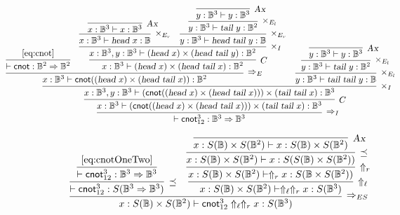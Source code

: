 \documentclass[preprint]{elsarticle}
\newcommand\B{\ensuremath{\mathbb B}}
\newcommand\s[1]{\ensuremath{\mathsf{#1}}}
\newcommand\head{\text{\sl head}}
\newcommand\tail{\text{\sl tail}}
\newcommand\tax{\textsl{Ax}}
\begin{document}
\begin{equation}
  \label{eq:cnotOneTwo}
  {
    \hspace{-1.5cm}
    \infer[\Rightarrow_I]
    {\vdash \s{cnot}_{12}^3:\B^3\Rightarrow\B^3}
    {
      \infer[C]
      {x:\B^3\vdash (\s{cnot}((\head\ x)\times(\head\ \tail\ x)))\times(\tail\ \tail\ x):\B^3}
      {
        \infer[\times_I]
        {x:\B^3,y:\B^3\vdash (\s{cnot}((\head\ x)\times(\head\ \tail\ x)))\times(\tail\ \tail\ x):\B^3}
        {
          \infer[\Rightarrow_E]
          {x:\B^3\vdash \s{cnot}((\head\ x)\times(\head\ \tail\ x)):\B^2}
          {
            \infer
            {\vdash \s{cnot}:\B^2\Rightarrow\B^2}
            {\eqref{eq:cnot}}
            &
            \infer[C]
            {x:\B^3\vdash(\head\ x)\times(\head\ \tail\ x):\B^2}
            {
              \infer[\times_I]
              {x:\B^3,y:\B^3\vdash(\head\ x)\times(\head\ \tail\ y):\B^2}
              {
                \infer[\times_{E_r}]
                {x:\B^3\vdash\head\ x:\B}
                {\infer[\tax]{x:\B^3\vdash x:\B^3}{}}
                &
                \infer[\times_{E_r}]
                {y:\B^3\vdash\head\ \tail\ y:\B}
                {
                  \infer[\times_{E_l}]
                  {y:\B^3\vdash\tail\ y:\B^2}
                  {
                    \infer[\tax]
                    {y:\B^3\vdash y:\B^3}
                    {}
                  }
                }
              }
            }
          }
          &
          \infer[\times_{E_l}]
          {y:\B^3\vdash \tail\ \tail\ y:\B}
          {
            \infer[\times_{E_l}]
            {y:\B^3\vdash \tail\ y:\B^2}
            {
              \infer[\tax]
              {y:\B^3\vdash y:\B^3}
              {}
            }
          }
        }
      }
    }
  }
\end{equation}

\begin{equation}
  \label{cnotOneTwoX}
  \infer[\Rightarrow_{ES}]
  {x:S(\B)\times S(\B^2)\vdash \s{cnot}_{12}^3\Uparrow_\ell \Uparrow_r x:S(\B^3)}
  {
    \infer[\preceq]
    {\vdash \s{cnot}_{12}^3: S(\B^3\Rightarrow\B^3)}
    {
      \infer
      {\vdash \s{cnot}_{12}^3:\B^3\Rightarrow\B^3}
      {\eqref{eq:cnotOneTwo}}
    }
    &
    \infer[\Uparrow_\ell]
    {x:S(\B)\times S(\B^2)\vdash\Uparrow_\ell \Uparrow_r  x:S(\B^3)}
    {
      \infer[\Uparrow_r]
      {x:S(\B)\times S(\B^2)\vdash\Uparrow_r  x:S(\B\times S(\B^2))}
      {
        \infer[\preceq]
        {x:S(\B)\times S(\B^2)\vdash x:S(S(\B)\times S(\B^2))}
        {
          \infer[\tax]
          {x:S(\B)\times S(\B^2)\vdash x:S(\B)\times S(\B^2)}
          {}
        }
      }
    }
  }
\end{equation}
\end{document}
